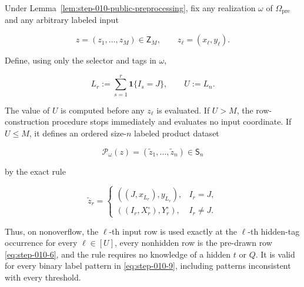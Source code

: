 \begin{proposition}\label{prop:step-010-row-construction}
Under Lemma~\ref{lem:step-010-public-preprocessing}, fix any realization
\(\omega\) of \(\Omega_{\mathrm{pre}}\) and any arbitrary labeled input

\[
  z=(z_1,\ldots,z_M)\in\mathsf Z_M,
  \qquad z_\ell=(x_\ell,y_\ell).
\tag{S10.9}\label{eq:step-010-9}
\]

Define, using only the selector and tags in \(\omega\),

\[
  L_r:=\sum_{s=1}^r\mathbf1\{I_s=J\},
  \qquad
  U:=L_n.
\tag{S10.10}\label{eq:step-010-10}
\]

The value of \(U\) is computed before any \(z_\ell\) is evaluated. If
\(U>M\), the row-construction procedure stops immediately and evaluates no
input coordinate. If \(U\le M\), it defines an ordered size-\(n\) labeled
product dataset

\[
  \mathcal P_\omega(z)
  =(\widetilde z_1,\ldots,\widetilde z_n)\in\mathsf S_n
\tag{S10.11}\label{eq:step-010-11}
\]

by the exact rule

\[
  \widetilde z_r=
  \begin{cases}
    ((J,x_{L_r}),y_{L_r}), & I_r=J,\\[2mm]
    ((I_r,X_r^\circ),Y_r^\circ), & I_r\ne J.
  \end{cases}
\tag{S10.12}\label{eq:step-010-12}
\]

Thus, on nonoverflow, the \(\ell\)-th input row is used exactly at the
\(\ell\)-th hidden-tag occurrence for every \(\ell\in[U]\), every
nonhidden row is the pre-drawn row \eqref{eq:step-010-6}, and the rule requires no knowledge
of a hidden \(t\) or \(Q\). It is valid for every binary label pattern in
\eqref{eq:step-010-9}, including patterns inconsistent with every threshold.
\end{proposition}

